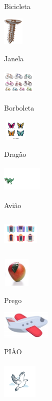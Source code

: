Bicicleta

\includegraphics[width=0.38403in,height=0.53889in]{media/image59.png}

Janela

\includegraphics[width=0.60069in,height=0.48056in]{media/image60.png}

Borboleta

\includegraphics[width=0.49028in,height=0.40833in]{media/image61.png}

Dragão

\includegraphics[width=0.74931in,height=0.52292in]{media/image62.png}

Avião

\includegraphics[width=0.68542in,height=0.66319in]{media/image63.png}

\includegraphics[width=0.53403in,height=0.56667in]{media/image64.jpeg}

Prego

\includegraphics[width=0.91319in,height=0.52292in]{media/image65.png}

PIÃO

\includegraphics[width=0.65385in,height=0.73262in]{media/image66.png}

